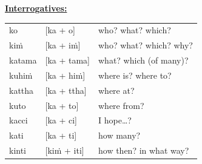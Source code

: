 \documentclass[11pt,oneside]{memoir}
\begin{document}
\textbf{\uline{Interrogatives:}}

\begin{tabular}{lll}
ko & {[}ka + o] & who? what? which?\\
kiṁ & {[}ka + iṁ] & who? what? which? why?\\
katama & {[}ka + tama] & what? which (of many)?\\
kuhiṁ & {[}ka + hiṁ] & where is? where to?\\
kattha & {[}ka + ttha] & where at?\\
kuto & {[}ka + to] & where from?\\
kacci & {[}ka + ci] & I hope\ldots{}?\\
kati & {[}ka + ti] & how many?\\
kinti & {[}kiṁ + iti] & how then? in what way?\\
\end{tabular}
\end{document}
